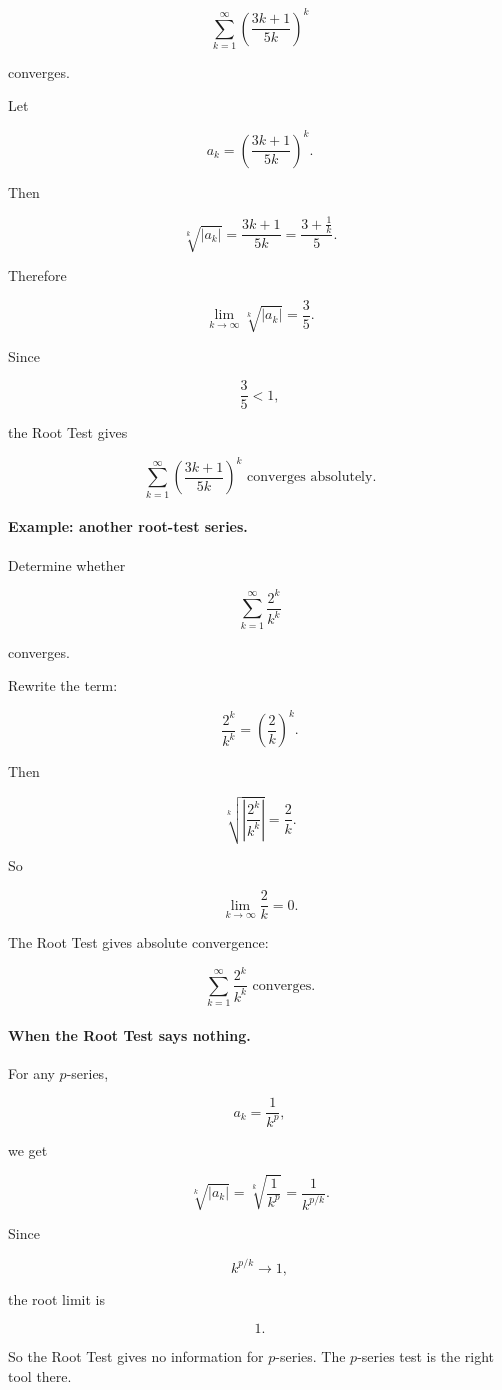 \[
\sum_{k=1}^{\infty}
\left(\frac{3k+1}{5k}\right)^k
\]

converges.

Let

\[
a_k=\left(\frac{3k+1}{5k}\right)^k.
\]

Then

\[
\sqrt[k]{|a_k|}
=
\frac{3k+1}{5k}
=
\frac{3+\frac1k}{5}.
\]

Therefore

\[
\lim_{k\to\infty}\sqrt[k]{|a_k|}
=
\frac35.
\]

Since

\[
\frac35<1,
\]

the Root Test gives

\[
\boxed{
\sum_{k=1}^{\infty}
\left(\frac{3k+1}{5k}\right)^k
\text{ converges absolutely.}
}
\]

\paragraph{Example: another root-test series.}
Determine whether

\[
\sum_{k=1}^{\infty}\frac{2^k}{k^k}
\]

converges.

Rewrite the term:

\[
\frac{2^k}{k^k}=\left(\frac2k\right)^k.
\]

Then

\[
\sqrt[k]{\left|\frac{2^k}{k^k}\right|}
=
\frac2k.
\]

So

\[
\lim_{k\to\infty}\frac2k=0.
\]

The Root Test gives absolute convergence:

\[
\boxed{
\sum_{k=1}^{\infty}\frac{2^k}{k^k}
\text{ converges.}
}
\]

\paragraph{When the Root Test says nothing.}
For any \(p\)-series,

\[
a_k=\frac1{k^p},
\]

we get

\[
\sqrt[k]{|a_k|}
=
\sqrt[k]{\frac1{k^p}}
=
\frac1{k^{p/k}}.
\]

Since

\[
k^{p/k}\to1,
\]

the root limit is

\[
1.
\]

So the Root Test gives no information for \(p\)-series.  The \(p\)-series test is the right
tool there.

